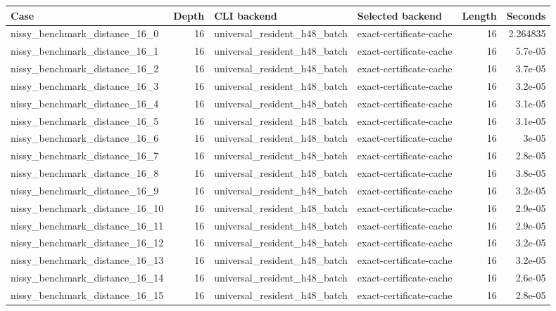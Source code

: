 {\small
\begin{tabular}{lrllrr}
\hline
Case & Depth & CLI backend & Selected backend & Length & Seconds \\
\hline
nissy\_benchmark\_distance\_16\_0 & 16 & universal\_resident\_h48\_batch & exact-certificate-cache & 16 & 2.264835 \\
nissy\_benchmark\_distance\_16\_1 & 16 & universal\_resident\_h48\_batch & exact-certificate-cache & 16 & 5.7e-05 \\
nissy\_benchmark\_distance\_16\_2 & 16 & universal\_resident\_h48\_batch & exact-certificate-cache & 16 & 3.7e-05 \\
nissy\_benchmark\_distance\_16\_3 & 16 & universal\_resident\_h48\_batch & exact-certificate-cache & 16 & 3.2e-05 \\
nissy\_benchmark\_distance\_16\_4 & 16 & universal\_resident\_h48\_batch & exact-certificate-cache & 16 & 3.1e-05 \\
nissy\_benchmark\_distance\_16\_5 & 16 & universal\_resident\_h48\_batch & exact-certificate-cache & 16 & 3.1e-05 \\
nissy\_benchmark\_distance\_16\_6 & 16 & universal\_resident\_h48\_batch & exact-certificate-cache & 16 & 3e-05 \\
nissy\_benchmark\_distance\_16\_7 & 16 & universal\_resident\_h48\_batch & exact-certificate-cache & 16 & 2.8e-05 \\
nissy\_benchmark\_distance\_16\_8 & 16 & universal\_resident\_h48\_batch & exact-certificate-cache & 16 & 3.8e-05 \\
nissy\_benchmark\_distance\_16\_9 & 16 & universal\_resident\_h48\_batch & exact-certificate-cache & 16 & 3.2e-05 \\
nissy\_benchmark\_distance\_16\_10 & 16 & universal\_resident\_h48\_batch & exact-certificate-cache & 16 & 2.9e-05 \\
nissy\_benchmark\_distance\_16\_11 & 16 & universal\_resident\_h48\_batch & exact-certificate-cache & 16 & 2.9e-05 \\
nissy\_benchmark\_distance\_16\_12 & 16 & universal\_resident\_h48\_batch & exact-certificate-cache & 16 & 3.2e-05 \\
nissy\_benchmark\_distance\_16\_13 & 16 & universal\_resident\_h48\_batch & exact-certificate-cache & 16 & 3.2e-05 \\
nissy\_benchmark\_distance\_16\_14 & 16 & universal\_resident\_h48\_batch & exact-certificate-cache & 16 & 2.6e-05 \\
nissy\_benchmark\_distance\_16\_15 & 16 & universal\_resident\_h48\_batch & exact-certificate-cache & 16 & 2.8e-05 \\

\end{tabular}}
